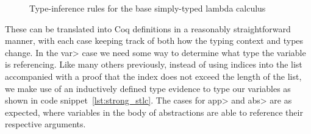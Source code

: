   \begin{figure}
    \caption{Type-inference rules for the base simply-typed lambda calculus}
    \label{fig:base_infer}
  \end{figure}

  These can be translated into Coq definitions in a reasonably straightforward manner, with each case keeping track of both how the typing context and types change.
  In the \<var> case we need some way to determine what type the variable is referencing.
  Like many others previously\cite{Benton2011}\cite{Coquand1994}, instead of using indices into the list accompanied with a proof that the index does not exceed the length of the list, we make use of an inductively defined type evidence to type our variables as shown in code snippet~\ref{lst:strong_stlc}.
  The cases for \<app> and \<abs> are as expected, where variables in the body of abstractions are able to reference their respective arguments.

